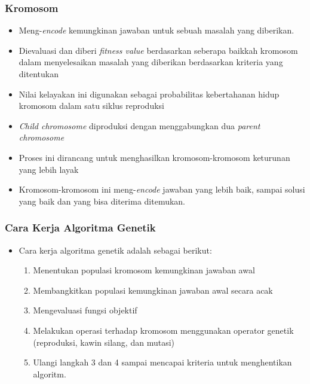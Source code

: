 \documentclass{beamer}
\begin{document}
\begin{frame}
\frametitle{Kromosom}
\begin{itemize}
\item Meng-\textit{encode} kemungkinan jawaban untuk sebuah masalah yang diberikan.
\item Dievaluasi dan diberi \textit{fitness value} berdasarkan seberapa baikkah kromosom dalam menyelesaikan masalah yang diberikan berdasarkan kriteria yang ditentukan
\item Nilai kelayakan ini digunakan sebagai probabilitas kebertahanan hidup kromosom dalam satu siklus reproduksi
\item \textit{Child chromosome} diproduksi dengan menggabungkan dua \textit{parent chromosome}
\item Proses ini dirancang untuk menghasilkan kromosom-kromosom keturunan yang lebih layak
\item Kromosom-kromosom ini meng-\textit{encode} jawaban yang lebih baik, sampai solusi yang baik dan yang bisa diterima ditemukan.
\end{itemize}
\end{frame}


\begin{frame}
\frametitle{Cara Kerja Algoritma Genetik}
\begin{itemize}
\item Cara kerja algoritma genetik adalah sebagai berikut:
	\begin{enumerate}
	\item Menentukan populasi kromosom kemungkinan jawaban awal
	\item Membangkitkan populasi kemungkinan jawaban awal secara acak
	\item Mengevaluasi fungsi objektif
	\item Melakukan operasi terhadap kromosom menggunakan operator genetik (reproduksi, kawin silang, dan mutasi)
	\item Ulangi langkah 3 dan 4 sampai mencapai kriteria untuk menghentikan algoritm.
	\end{enumerate}
\end{itemize}
\end{frame}
\end{document}
